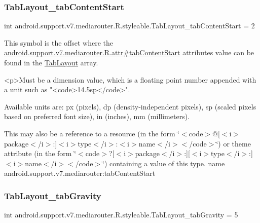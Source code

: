 \subsubsection{\texorpdfstring{Tab\+Layout\+\_\+tab\+Content\+Start}{TabLayout\_tabContentStart}}
{\footnotesize\ttfamily int android.\+support.\+v7.\+mediarouter.\+R.\+styleable.\+Tab\+Layout\+\_\+tab\+Content\+Start = 2\hspace{0.3cm}{\ttfamily [static]}}

This symbol is the offset where the \hyperlink{classandroid_1_1support_1_1v7_1_1mediarouter_1_1R_1_1attr_af723b082e7ee1fd2f3336ef0f0c67681}{android.\+support.\+v7.\+mediarouter.\+R.\+attr\#tab\+Content\+Start} attribute\textquotesingle{}s value can be found in the \hyperlink{classandroid_1_1support_1_1v7_1_1mediarouter_1_1R_1_1styleable_a94de1350e0a902b4a974d775f2f4f25e}{Tab\+Layout} array.

\begin{DoxyVerb}      <p>Must be a dimension value, which is a floating point number appended with a unit such as "<code>14.5sp</code>".
\end{DoxyVerb}
 Available units are\+: px (pixels), dp (density-\/independent pixels), sp (scaled pixels based on preferred font size), in (inches), mm (millimeters). 

This may also be a reference to a resource (in the form \char`\"{}$<$code$>$@\mbox{[}$<$i$>$package$<$/i$>$\+:\mbox{]}$<$i$>$type$<$/i$>$\+:$<$i$>$name$<$/i$>$$<$/code$>$\char`\"{}) or theme attribute (in the form \char`\"{}$<$code$>$?\mbox{[}$<$i$>$package$<$/i$>$\+:\mbox{]}\mbox{[}$<$i$>$type$<$/i$>$\+:\mbox{]}$<$i$>$name$<$/i$>$$<$/code$>$\char`\"{}) containing a value of this type.  name android.\+support.\+v7.\+mediarouter\+:tab\+Content\+Start \mbox{\label{classandroid_1_1support_1_1v7_1_1mediarouter_1_1R_1_1styleable_a411d6e18585a008c7a903a5f997cfee4}} 
\subsubsection{\texorpdfstring{Tab\+Layout\+\_\+tab\+Gravity}{TabLayout\_tabGravity}}
{\footnotesize\ttfamily int android.\+support.\+v7.\+mediarouter.\+R.\+styleable.\+Tab\+Layout\+\_\+tab\+Gravity = 5\hspace{0.3cm}{\ttfamily [static]}}

